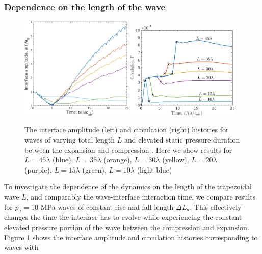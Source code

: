 \subsubsection{Dependence on the length of the wave}%
\begin{figure}[h]
  \centering
  \includegraphics[width=0.48\textwidth]{./figs/lung_figs/interface_multi-lag}
  \includegraphics[width=0.48\textwidth]{./figs/lung_figs/circulation_multi-lag_fixed}
  \caption[The interface and circulation dependence on wave
  duration]{The interface amplitude (left) and circulation (right)
    histories for waves of varying total length $L$ and elevated
    static pressure duration between the expansion and compression
    . Here we show results for $L=45\lambda$ (blue), $L=35\lambda$
    (orange), $L=30\lambda$ (yellow), $L=20\lambda$ (purple),
    $L=15\lambda$ (green), $L=10\lambda$ (light blue)}
  \label{fig:trapz_circ_interface_multi-lag}
\end{figure}
To investigate the dependence of the dynamics on the length of the
trapezoidal wave $L$, and comparably the wave-interface interaction
time, we compare results for $p_a=10$ MPa waves of constant rise and
fall length $\Delta L_a$. This effectively changes the time the
interface has to evolve while experiencing the constant elevated
pressure portion of the wave between the compression and expansion.
Figure \ref{fig:trapz_circ_interface_multi-lag} shows the interface
amplitude and circulation histories corresponding to waves with
